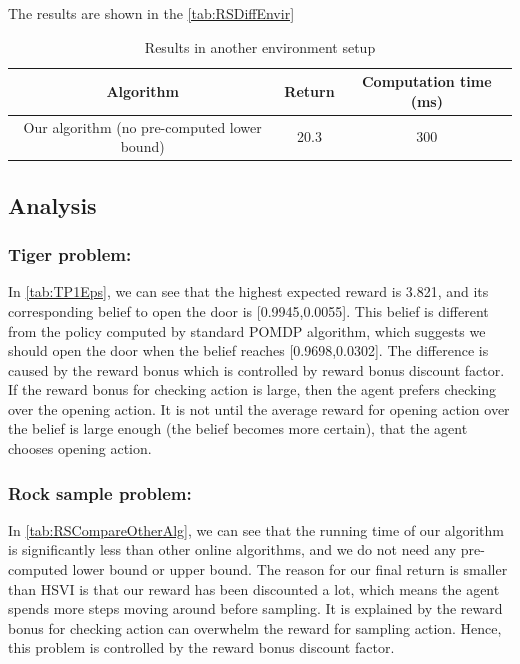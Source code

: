 \documentclass{article}
\begin{document}
The results are shown in the \autoref{tab:RSDiffEnvir}

\begin{table}[H]
\begin{center}
	\begin{tabular} {| c | c | c |}
		\hline \hline
		Algorithm & Return & Computation time (ms) \\
		\hline
		Our algorithm (no pre-computed lower bound) & 20.3 & 300 \\
		\hline \hline
	\end{tabular}
\end{center}
\caption{Results in another environment setup}
\label{tab:RSDiffEnvir}
\end{table}


\subsection{Analysis}

\subsubsection{Tiger problem:} 
In \autoref{tab:TP1Eps}, we can see that the highest expected reward is 3.821, and its
corresponding belief to open the door is [0.9945,0.0055]. This belief is different from
the policy computed by standard POMDP algorithm, which suggests we should open the door
when the belief reaches [0.9698,0.0302]. The difference is caused by the reward bonus
which is controlled by reward bonus discount factor. If the reward bonus for checking
action is large, then the agent prefers checking over the opening action. It is not 
until the average reward for opening action over the belief is large enough (the belief
becomes more certain), that the agent chooses opening action.


\subsubsection{Rock sample problem:} 
In \autoref{tab:RSCompareOtherAlg}, we can see that
the running time of our algorithm is significantly less than other online algorithms,
and we do not need any pre-computed lower bound or upper bound. The reason for our final
return is smaller than HSVI is that our reward has been discounted a lot, which means the
agent spends more steps moving around before sampling. It is explained by the reward bonus
for checking action can overwhelm the reward for sampling action. Hence, this problem is
controlled by the reward bonus discount factor.
\end{document}
